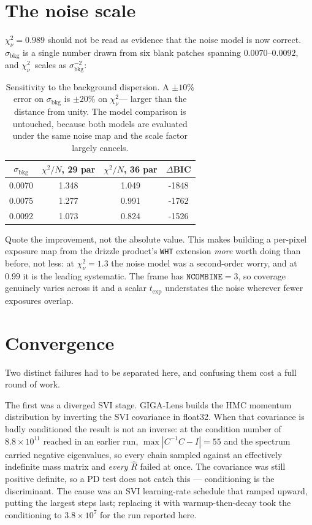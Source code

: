 \documentclass[11pt]{article}
\newcommand{\chisqv}{\ensuremath{\chi^{2}_{\nu}}}
\begin{document}
\section{The noise scale}
\label{sec:noise}

$\chisqv = 0.989$ should not be read as evidence that the noise model is now correct.
$\sigma_{\mathrm{bkg}}$ is a single number drawn from six blank patches spanning
$0.0070$--$0.0092$, and \chisqv\ scales as $\sigma_{\mathrm{bkg}}^{-2}$:

\begin{table}[htbp]
  \centering
  \caption{Sensitivity to the background dispersion. A $\pm10\%$ error on
    $\sigma_{\mathrm{bkg}}$ is $\pm20\%$ on \chisqv --- larger than the distance from
    unity. The model comparison is untouched, because both models are evaluated under the
    same noise map and the scale factor largely cancels.}
  \label{tab:noise}
  \begin{tabular}{S[table-format=1.4]S[table-format=1.3]S[table-format=1.3]S[table-format=-4.0]}
    \toprule
    {$\sigma_{\mathrm{bkg}}$} & {$\chi^{2}/N$, 29 par} & {$\chi^{2}/N$, 36 par} & {$\Delta$BIC} \\
     & 1.348 & 1.049 & -1848 \\
    0.0075 & 1.277 & 0.991 & -1762 \\
    0.0092 & 1.073 & 0.824 & -1526 \\
    \bottomrule
  \end{tabular}
\end{table}

Quote the improvement, not the absolute value. This makes building a per-pixel exposure
map from the drizzle product's \texttt{WHT} extension \emph{more} worth doing than before,
not less: at $\chisqv = 1.3$ the noise model was a second-order worry, and at $0.99$ it is
the leading systematic. The frame has $\mathtt{NCOMBINE} = 3$, so coverage genuinely
varies across it and a scalar $t_{\mathrm{exp}}$ understates the noise wherever fewer
exposures overlap.

\section{Convergence}
\label{sec:conv}

Two distinct failures had to be separated here, and confusing them cost a full round of
work.

The first was a diverged SVI stage. GIGA-Lens builds the HMC momentum distribution by
inverting the SVI covariance in float32. When that covariance is badly conditioned the
result is not an inverse: at the condition number of $8.8\times10^{11}$ reached in an
earlier run, $\max|C^{-1}C - I| = 55$ and the spectrum carried negative eigenvalues, so
every chain sampled against an effectively indefinite mass matrix and \emph{every}
$\hat{R}$ failed at once. The covariance was still positive definite, so a PD test does
not catch this --- conditioning is the discriminant. The cause was an SVI learning-rate
schedule that ramped upward, putting the largest steps last; replacing it with
warmup-then-decay took the conditioning to $3.8\times10^{7}$ for the run reported here.
\end{document}
